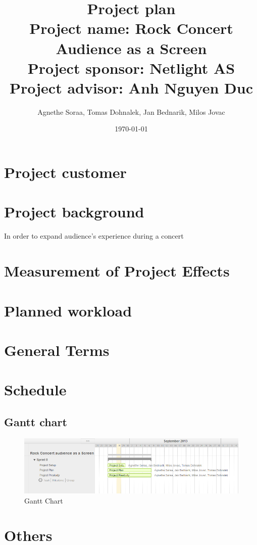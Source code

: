 \documentclass{article}
\title{\Huge Project plan \\ 
    \normalsize  Project name: Rock Concert Audience as a Screen \\
    Project sponsor: Netlight AS \\
    Project advisor: Anh Nguyen Duc}
\author{Agnethe Soraa,
Tomas Dohnalek,
Jan Bednarik,
Milos Jovac}
\date{\today}
\begin{document}
\maketitle
\section{Project customer}
\section{Project background}
In order to expand audience's experience during a concert

\section{Measurement of Project Effects}
\section{Planned workload}
\section{General Terms}
\section{Schedule}
\subsection{Gantt chart}

\begin{figure}[ht]
\begin{center}
    \includegraphics[scale=0.6]{images/gantt}
    \caption{Gantt Chart}
    \label{img:gantt}
\end{center}
\end{figure}


\section{Others}
\end{document}
